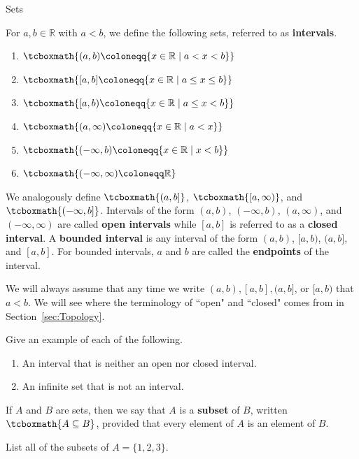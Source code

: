 \begin{section}{Sets}
\begin{definition}\label{def:intervals}
For $a,b\in\mathbb{R}$ with $a<b$, we define the following sets, referred to as \textbf{intervals}.
\begin{enumerate}[label=\textrm{(\alph*)}]
\item $\tcboxmath{(a,b)\coloneqq \{x\in\mathbb{R}\mid a<x<b\}}$
\item $\tcboxmath{[a,b]\coloneqq \{x\in\mathbb{R}\mid a\leq x\leq b\}}$
\item $\tcboxmath{[a,b)\coloneqq \{x\in\mathbb{R}\mid a\leq x< b\}}$
\item $\tcboxmath{(a,\infty)\coloneqq \{x\in\mathbb{R}\mid a<x\}}$
\item $\tcboxmath{(-\infty,b)\coloneqq \{x\in\mathbb{R}\mid x<b\}}$
\item $\tcboxmath{(-\infty,\infty)\coloneqq \mathbb{R}}$
\end{enumerate}
We analogously define $\tcboxmath{(a,b]}$, $\tcboxmath{[a,\infty)}$, and $\tcboxmath{(-\infty,b]}$. Intervals of the form $(a,b)$, $(-\infty,b)$, $(a,\infty)$, and $(-\infty,\infty)$ are called \textbf{open intervals} while $[a,b]$ is referred to as a \textbf{closed interval}. A \textbf{bounded interval} is any interval of the form $(a,b)$, $[a,b)$, $(a,b]$, and $[a,b]$. For bounded intervals, $a$ and $b$ are called the \textbf{endpoints} of the interval.
\end{definition}

We will always assume that any time we write $(a,b), [a,b], (a,b]$, or $[a,b)$ that $a<b$. We will see where the terminology of ``open" and ``closed" comes from in Section~\ref{sec:Topology}. 

\begin{problem}
Give an example of each of the following.
\begin{enumerate}[label=\textrm{(\alph*)}]
\item An interval that is neither an open nor closed interval.
\item An infinite set that is not an interval.
\end{enumerate}
\end{problem}

\begin{definition}
If $A$ and $B$ are sets, then we say that $A$ is a \textbf{subset} of $B$, written $\tcboxmath{A\subseteq B}$, provided that every element of $A$ is an element of $B$.
\end{definition}

\begin{problem}
List all of the subsets of $A=\{1,2,3\}$.  %
\end{problem}


\end{section}
